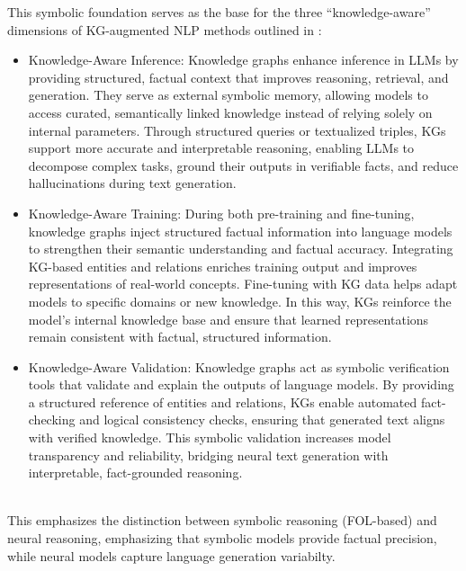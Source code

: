 \documentclass[conference]{IEEEtran}
\begin{document}
\noindent
This symbolic foundation serves as the base for the three “knowledge-aware” dimensions of KG-augmented NLP methods outlined in \cite{agrawal2024kg_hallucinations}:
\begin{itemize}
    \item Knowledge-Aware Inference: Knowledge graphs enhance inference in LLMs by providing structured, factual context that improves reasoning, retrieval, and generation. They serve as external symbolic memory, allowing models to access curated, semantically linked knowledge instead of relying solely on internal parameters. Through structured queries or textualized triples, KGs support more accurate and interpretable reasoning, enabling LLMs to decompose complex tasks, ground their outputs in verifiable facts, and reduce hallucinations during text generation.

    \item Knowledge-Aware Training: During both pre-training and fine-tuning, knowledge graphs inject structured factual information into language models to strengthen their semantic understanding and factual accuracy. Integrating KG-based entities and relations enriches training output and improves representations of real-world concepts. Fine-tuning with KG data helps adapt models to specific domains or new knowledge. In this way, KGs reinforce the model’s internal knowledge base and ensure that learned representations remain consistent with factual, structured information.
    
    \item Knowledge-Aware Validation: Knowledge graphs act as symbolic verification tools that validate and explain the outputs of language models. By providing a structured reference of entities and relations, KGs enable automated fact-checking and logical consistency checks, ensuring that generated text aligns with verified knowledge. This symbolic validation increases model transparency and reliability, bridging neural text generation with interpretable, fact-grounded reasoning.
\end{itemize}
    
    
\noindent
\\
This emphasizes the distinction between symbolic reasoning (FOL-based) \cite{semanticweb2024slides} and neural reasoning, emphasizing that symbolic models provide factual precision, while neural models capture language generation variabilty.




 
\end{document}
